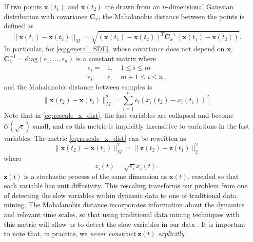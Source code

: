 If two points $\mathbf{x}(t_1)$ and $\mathbf{x}(t_2)$ are drawn from an $n$-dimensional
Gaussian distribution with covariance $\mathbf{C}_x$, the Mahalanobis distance between the points is defined as \cite{mahalanobis1936generalized}
\begin{equation}
	\| \mathbf{x}(t_1) - \mathbf{x}(t_2) \| _M = \sqrt{ (\mathbf{x}(t_1) - \mathbf{x}(t_2))^T \mathbf{C}_x^{-1} (\mathbf{x}(t_1) - \mathbf{x}(t_2) )  }.
\end{equation}
In particular, 
for \eqref{eq:general_SDE}, whose covariance does not depend on $\mathbf{x}$,  $\mathbf{C}_x^{-1} = \mathrm{diag}(e_1, \ldots, e_n)$ is a constant matrix where
\begin{equation} \label{eq:e_def}
\begin{aligned}
e_i =& 1, \: & 1 \le i \le m \\
e_i =& \epsilon, \: & m+1 \le i \le n,
\end{aligned}
\end{equation}
and the Mahalanobis distance between samples is
\begin{equation} \label{eq:rescale_x_dist}
\| \mathbf{x}(t_2) - \mathbf{x}(t_1) \|^2_M = \sum_{i=1}^n e_i \left( x_i(t_2) - x_i(t_1) \right)^2.
\end{equation}
Note that in \eqref{eq:rescale_x_dist}, the fast variables are collapsed and become $\mathcal{O}(\sqrt{\epsilon})$ small,
and so this metric is implicitly insensitive to variations in the fast variables.
%
The metric \eqref{eq:rescale_x_dist} can be rewritten as
\begin{equation} \label{eq:norm_z}
\| \mathbf{x}(t_2) - \mathbf{x}(t_1) \|^2_M = \| \mathbf{z}(t_2) - \mathbf{z}(t_1) \|^2_2
\end{equation}
where
\begin{equation} \label{eq:general_rescale}
z_i(t) = \sqrt{e_i} x_i(t).
\end{equation}
$\mathbf{z}(t)$ is a stochastic process of the same dimension as $\mathbf{x}(t)$, rescaled so that each variable has unit diffusivity.
%
This rescaling transforms our problem from one of detecting the slow variables within dynamic data to one of traditional data mining.
%
The Mahalanobis distance incorporates information about the dynamics and relevant time scales, so that using traditional data mining techniques with this metric will allow us to detect the slow variables in our data \cite{singer2009detecting}.
%
It is important to note that, in practice, we {\em never construct} $\mathbf{z}(t)$ {\em explicitly}.
